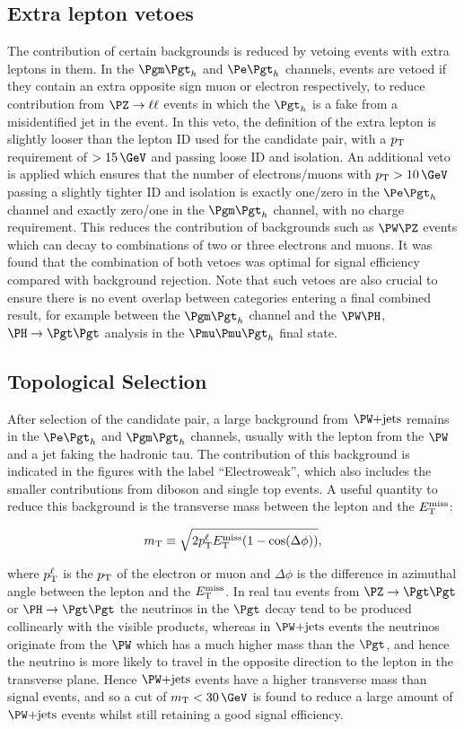 \subsection{Extra lepton vetoes}

The contribution of certain backgrounds is reduced by vetoing events with extra
leptons in them. In the $\mutau$ and $\etau$ channels, events are vetoed if they contain an extra
opposite sign muon or electron respectively, to reduce contribution from 
$\PZ\to\ell\ell$ events in which the $\Pgth$ is a fake from a misidentified 
jet in the event. In this veto, the definition of the extra lepton is slightly 
looser than the lepton ID used for the candidate pair, with a $p_{\mathrm{T}}$ requirement
of $>15\,\GeV$ and passing loose ID and isolation. 
An additional veto is applied which ensures that the number of
electrons/muons with $\pt>10\,\GeV$ passing a slightly tighter ID and isolation
is exactly one/zero in the $\etau$ channel and exactly zero/one in the $\mutau$ channel, with no charge
requirement. This reduces the contribution of backgrounds such as $\PW\PZ$
events which can decay to combinations of two or three electrons and muons. 
It was found that the combination of both vetoes was optimal for signal
efficiency compared with background rejection. Note that such vetoes are also crucial 
to ensure there is no event overlap between categories entering a final combined 
result, for example between the $\mutau$ channel and the 
$\PW\PH$, $\PH\to\Pgt\Pgt$ analysis in the $\Pmu\Pmu\Pgth$ final state. 

\subsection{Topological Selection}
\label{sec:topologicalselection}

After selection of the candidate pair, a large background from $\WJets$ remains
in the $\etau$ and $\mutau$ channels, usually with the lepton from the $\PW$ and
a jet faking the hadronic tau. The contribution of this background is indicated
in the figures with the label ``Electroweak'', which also includes the smaller
contributions from diboson and single top events. A useful quantity to reduce this background is
the transverse mass between the lepton and the $E_{\mathrm{T}}^{\text{miss}}$:

\begin{equation}
m_{\text{T}}\equiv\sqrt{2p_{\mathrm{T}}^{\ell}E_{\mathrm{T}}^{\text{miss}}(1-\cos(\Delta\phi))},
\end{equation}

where $p_{\mathrm{T}}^{\ell}$ is the $p_{\mathrm{T}}$ of the electron or muon and $\Delta\phi$ is the
difference in azimuthal angle between the lepton and the $E_{\mathrm{T}}^{\text{miss}}$. In real tau
events from $\PZ\to\Pgt\Pgt$ or $\PH\to\Pgt\Pgt$ the neutrinos in the $\Pgt$
decay tend to be produced collinearly with the visible products, whereas in
$\WJets$ events the neutrinos originate from the $\PW$ which has a much higher
mass than the $\Pgt$, and hence the neutrino is more likely to travel in the
opposite direction to the lepton in the transverse plane. Hence $\WJets$ events
have a higher transverse mass than signal events, and so a cut of
$m_{\text{T}}<30\,\GeV$ is found to reduce a large amount of $\WJets$ events
whilst still retaining a good signal efficiency. 

